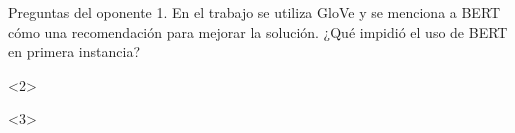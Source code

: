 \documentclass{beamer}
\begin{document}
\begin{frame}[t]{Preguntas del oponente}
    1. En el trabajo se utiliza GloVe y se menciona a BERT cómo una recomendación para mejorar la 
    solución. ¿Qué impidió el uso de BERT en primera instancia?

    


    \begin{onlyenv}<2>
        \begin{figure}
            
        \end{figure}
    \end{onlyenv}
    \begin{onlyenv}<3>
        \begin{figure}
            
        \end{figure}
    \end{onlyenv}
\end{frame}
\end{document}
